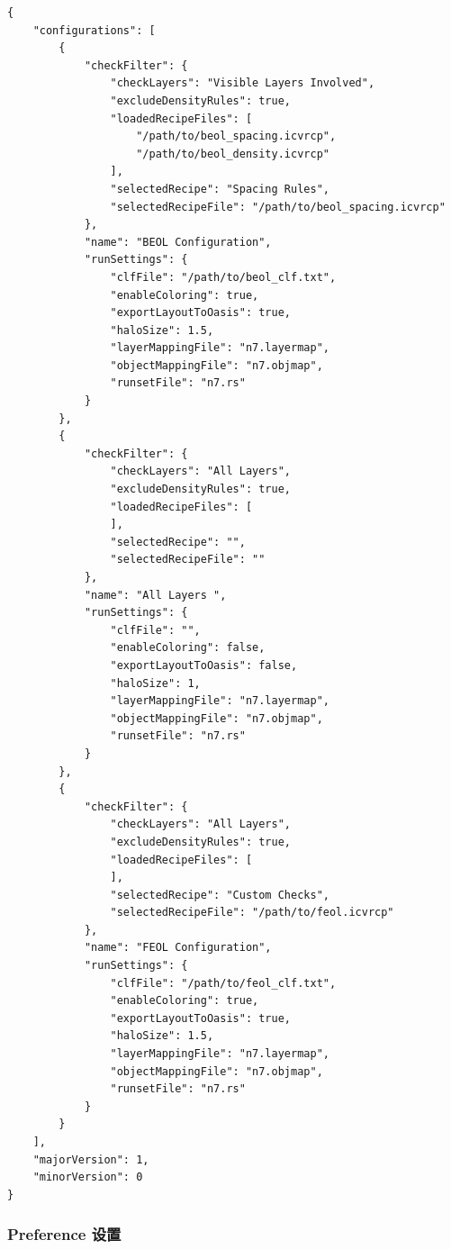 \begin{lstlisting}[style=shell]
{
    "configurations": [
        {
            "checkFilter": {
                "checkLayers": "Visible Layers Involved",
                "excludeDensityRules": true,
                "loadedRecipeFiles": [
                    "/path/to/beol_spacing.icvrcp",
                    "/path/to/beol_density.icvrcp"
                ],
                "selectedRecipe": "Spacing Rules",
                "selectedRecipeFile": "/path/to/beol_spacing.icvrcp"
            },
            "name": "BEOL Configuration",
            "runSettings": {
                "clfFile": "/path/to/beol_clf.txt",
                "enableColoring": true,
                "exportLayoutToOasis": true,
                "haloSize": 1.5,
                "layerMappingFile": "n7.layermap",
                "objectMappingFile": "n7.objmap",
                "runsetFile": "n7.rs"
            }
        },
        {
            "checkFilter": {
                "checkLayers": "All Layers",
                "excludeDensityRules": true,
                "loadedRecipeFiles": [
                ],
                "selectedRecipe": "",
                "selectedRecipeFile": ""
            },
            "name": "All Layers ",
            "runSettings": {
                "clfFile": "",
                "enableColoring": false,
                "exportLayoutToOasis": false,
                "haloSize": 1,
                "layerMappingFile": "n7.layermap",
                "objectMappingFile": "n7.objmap",
                "runsetFile": "n7.rs"
            }
        },
        {
            "checkFilter": {
                "checkLayers": "All Layers",
                "excludeDensityRules": true,
                "loadedRecipeFiles": [
                ],
                "selectedRecipe": "Custom Checks",
                "selectedRecipeFile": "/path/to/feol.icvrcp"
            },
            "name": "FEOL Configuration",
            "runSettings": {
                "clfFile": "/path/to/feol_clf.txt",
                "enableColoring": true,
                "exportLayoutToOasis": true,
                "haloSize": 1.5,
                "layerMappingFile": "n7.layermap",
                "objectMappingFile": "n7.objmap",
                "runsetFile": "n7.rs"
            }
        }
    ],
    "majorVersion": 1,
    "minorVersion": 0
}
\end{lstlisting}

\subsubsection{Preference 设置}
